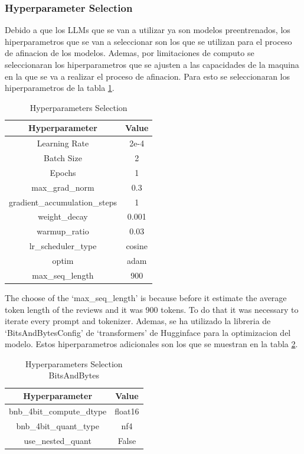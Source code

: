 \subsubsection{Hyperparameter Selection}
Debido a que los LLMs que se van a utilizar ya son modelos preentrenados, los hiperparametros que se van a seleccionar son los que se utilizan para el proceso de afinacion de los modelos. 
Ademas, por limitaciones de computo se seleccionaran los hiperparametros que se ajusten a las capacidades de la maquina en la que se va a realizar el proceso de afinacion. Para esto se seleccionaran los hiperparametros de la tabla \ref{table:hyperparameters}.
\begin{table}[H]
    \centering
    \begin{tabular}{|c|c|}
        \hline
        \textbf{Hyperparameter} & \textbf{Value} \\
        \hline
        Learning Rate & 2e-4 \\
        Batch Size & 2 \\
        Epochs & 1 \\
        max\_grad\_norm & 0.3 \\
        gradient\_accumulation\_steps & 1 \\
        weight\_decay & 0.001 \\
        warmup\_ratio & 0.03 \\
        lr\_scheduler\_type & cosine \\
        optim & adam \\
        max\_seq\_length & 900 \\
        \hline
    \end{tabular}
    \caption{Hyperparameters Selection}
    \label{table:hyperparameters}
\end{table}
The choose of the `max\_seq\_length' is because before it estimate the average token length of the reviews and it was 900 tokens. To do that it was necessary to iterate every prompt and tokenizer. Ademas, se ha utilizado la libreria de `BitsAndBytesConfig' de `transformers' de Hugginface para la optimizacion del modelo. Estos hiperparametros adicionales son los que se muestran en la tabla \ref{table:hyperparameters-bitsandbytes}.
\begin{table}[H]
    \centering
    \begin{tabular}{|c|c|}
        \hline
        \textbf{Hyperparameter} & \textbf{Value} \\
        \hline
        bnb\_4bit\_compute\_dtype & float16 \\
        bnb\_4bit\_quant\_type & nf4 \\
        use\_nested\_quant & False \\
        \hline
    \end{tabular}
    \caption{Hyperparameters Selection BitsAndBytes}
    \label{table:hyperparameters-bitsandbytes}
\end{table}

